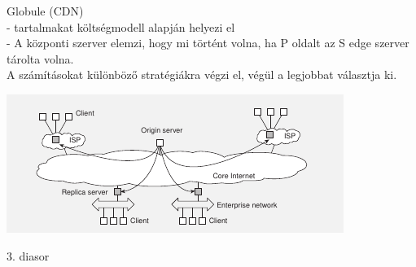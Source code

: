 \documentclass[12pt]{article}
\begin{document}
\begin{description}[style=unboxed]
    \item Globule (CDN)\\
        - tartalmakat költségmodell alapján helyezi el\\
        - A központi szerver elemzi, hogy mi történt volna, ha P oldalt az S edge szerver tárolta volna.\\
        A számításokat különböző stratégiákra végzi el, végül a legjobbat választja ki.\\
        \begin{center}
            \includegraphics[scale=0.9]{./images/Globule.png}
        \end{center}
        \hfill
\end{description}
3. diasor
\end{document}
